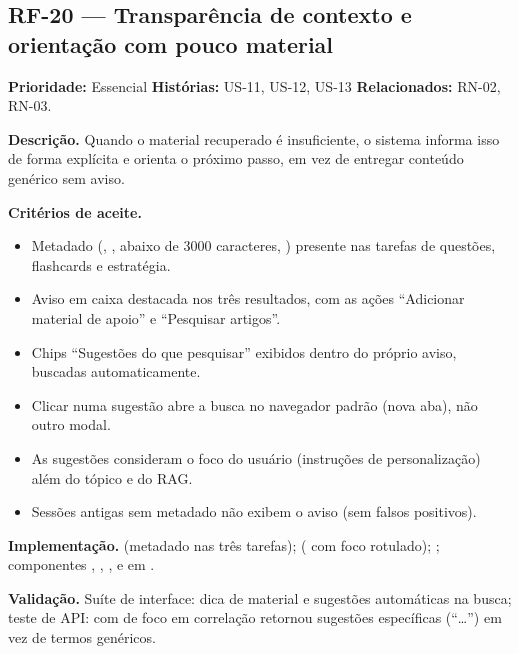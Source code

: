 \subsection{RF-20 --- Transparência de contexto e orientação com pouco material}

\textbf{Prioridade:} Essencial \quad \textbf{Histórias:} US-11, US-12, US-13 \quad \textbf{Relacionados:} RN-02, RN-03.

\textbf{Descrição.} Quando o material recuperado é insuficiente, o sistema informa isso de forma explícita e orienta o próximo passo, em vez de entregar conteúdo genérico sem aviso.

\textbf{Critérios de aceite.}
\begin{itemize}
    \item Metadado \texttt{} (\texttt{}, \texttt{}, \texttt{} abaixo de 3000 caracteres, \texttt{}) presente nas tarefas de questões, flashcards e estratégia.
    \item Aviso em caixa destacada nos três resultados, com as ações ``Adicionar material de apoio'' e ``Pesquisar artigos''.
    \item Chips ``Sugestões do que pesquisar'' exibidos dentro do próprio aviso, buscadas automaticamente.
    \item Clicar numa sugestão abre a busca no navegador padrão (nova aba), não outro modal.
    \item As sugestões consideram o foco do usuário (instruções de personalização) além do tópico e do RAG.
    \item Sessões antigas sem metadado não exibem o aviso (sem falsos positivos).
\end{itemize}

\textbf{Implementação.}  (metadado nas três tarefas);  (\texttt{} com foco rotulado); ; componentes \texttt{}, \texttt{}, \texttt{}, \texttt{} e \texttt{} em .

\textbf{Validação.} Suíte de interface: dica de material e sugestões automáticas na busca; teste de API: \texttt{} com \texttt{} de foco em correlação retornou sugestões específicas (``\texttt{}\dots'') em vez de termos genéricos.

